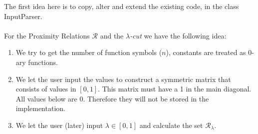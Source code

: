 \documentclass{article}
\begin{document}
The first idea here is to copy, alter and extend the existing code, in the class InputParser.
\\ \ \\
\noindent
For the Proximity Relations \(\mathcal{R}\) and the \(\lambda\)\textit{-cut} we have the following idea:\\
\begin{enumerate}
	\item We try to get the number of function symbols (\(n\)), constants are treated as 0-ary functions.
	\item We let the user input the values to construct a symmetric matrix that consists of values in \([0,1]\). This matrix must have a 1 in the main diagonal. All values below are 0. Therefore they will not be stored in the implementation.
	\item We let the user (later) input \(\lambda\in[0,1]\) and calculate the set \(\mathcal{R}_\lambda\).
\end{enumerate}
\end{document}
